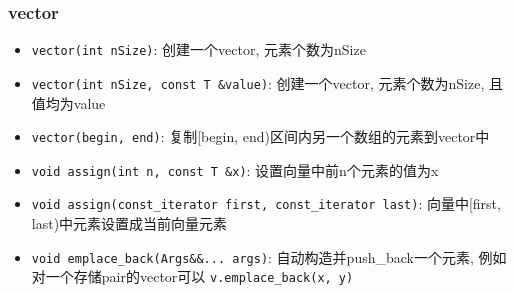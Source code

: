 \subsubsection{vector}
	\begin{itemize}
		\item \texttt{vector(int nSize)}: 创建一个vector, 元素个数为nSize
		\item \texttt{vector(int nSize, const T &value)}: 创建一个vector, 元素个数为nSize, 且值均为value
		\item \texttt{vector(begin, end)}: 复制[begin, end)区间内另一个数组的元素到vector中
		\item \texttt{void assign(int n, const T &x)}: 设置向量中前n个元素的值为x
		\item \texttt{void assign(const_iterator first, const_iterator last)}: 向量中[first, last)中元素设置成当前向量元素
		\item \texttt{void emplace_back(Args&&... args)}: 自动构造并push\_back一个元素, 例如对一个存储pair的vector可以 \texttt{v.emplace_back(x, y)}
	\end{itemize}


